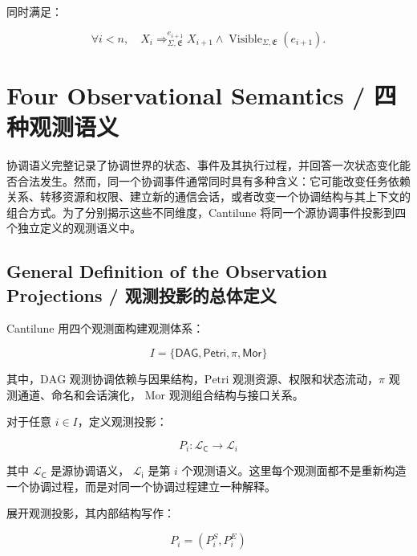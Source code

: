 同时满足：

\begin{equation}
  \boxed{
    \forall i<n,\quad
    X_i
    \Rightarrow_{\Sigma,\mathfrak E}^{e_{i+1}}
    X_{i+1}
    \land
    \operatorname{Visible}_{\Sigma,\mathfrak E}(e_{i+1}).
  }\label{eq:observable-path-step-condition}
\end{equation}



\section{Four Observational Semantics /
四种观测语义}

协调语义完整记录了协调世界的状态、事件及其执行过程，并回答一次状态变化能否合法发生。然而，同一个协调事件通常同时具有多种含义：它可能改变任务依赖关系、转移资源和权限、建立新的通信会话，或者改变一个协调结构与其上下文的组合方式。为了分别揭示这些不同维度，Cantilune 将同一个源协调事件投影到四个独立定义的观测语义中。

\subsection{General Definition of the Observation Projections /
观测投影的总体定义}

Cantilune 用四个观测面构建观测体系：

\begin{equation}
  \boxed{
    I=\{ \mathsf{DAG}, \mathsf{Petri}, \pi, \mathsf{Mor} \}
  }\label{eq:observation-index-set}
\end{equation}

其中，$\text{DAG}$ 观测协调依赖与因果结构，$\text{Petri}$ 观测资源、权限和状态流动，$\pi$ 观测通道、命名和会话演化， $\text{Mor}$ 观测组合结构与接口关系。

对于任意 $i \in I$，定义观测投影：

\begin{equation}
  \boxed{
  P_i:\mathcal{L}_{\mathsf C}\rightarrow\mathcal{L}_i}
  \label{eq:observation-projection}
\end{equation}

其中 $\mathcal{L}_{\mathsf C}$ 是源协调语义， $\mathcal{L}_{\mathsf i}$ 是第 $i$ 个观测语义。这里每个观测面都不是重新构造一个协调过程，而是对同一个协调过程建立一种解释。

展开观测投影，其内部结构写作：

\begin{equation}
  \boxed{P_i=(P_i^{S},P_i^{E})}
  \label{eq:observation-projection-components}
\end{equation}

